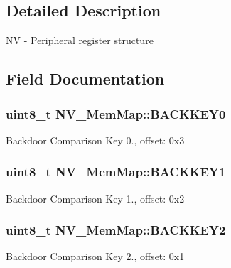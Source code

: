\subsection{Detailed Description}
N\+V -\/ Peripheral register structure 

\subsection{Field Documentation}
\hypertarget{struct_n_v___mem_map_ad6d790fea8e791ef5cda3685fe306a08}{}
\subsubsection[{B\+A\+C\+K\+K\+E\+Y0}]{\setlength{\rightskip}{0pt plus 5cm}uint8\+\_\+t N\+V\+\_\+\+Mem\+Map\+::\+B\+A\+C\+K\+K\+E\+Y0}\label{struct_n_v___mem_map_ad6d790fea8e791ef5cda3685fe306a08}
Backdoor Comparison Key 0., offset\+: 0x3 \hypertarget{struct_n_v___mem_map_ab43748ac2b6d99cef1a62072d17a707b}{}
\subsubsection[{B\+A\+C\+K\+K\+E\+Y1}]{\setlength{\rightskip}{0pt plus 5cm}uint8\+\_\+t N\+V\+\_\+\+Mem\+Map\+::\+B\+A\+C\+K\+K\+E\+Y1}\label{struct_n_v___mem_map_ab43748ac2b6d99cef1a62072d17a707b}
Backdoor Comparison Key 1., offset\+: 0x2 \hypertarget{struct_n_v___mem_map_af746c853a18c5e8910e556b32073f938}{}
\subsubsection[{B\+A\+C\+K\+K\+E\+Y2}]{\setlength{\rightskip}{0pt plus 5cm}uint8\+\_\+t N\+V\+\_\+\+Mem\+Map\+::\+B\+A\+C\+K\+K\+E\+Y2}\label{struct_n_v___mem_map_af746c853a18c5e8910e556b32073f938}
Backdoor Comparison Key 2., offset\+: 0x1 \hypertarget{struct_n_v___mem_map_a836e107cd6936ce8acd9279af7e9657e}{}
